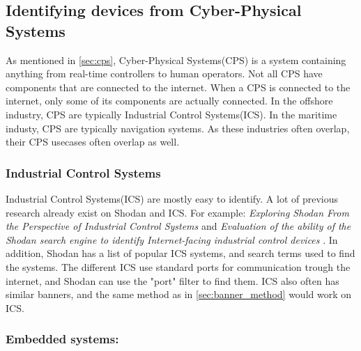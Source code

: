\subsection{Identifying devices from Cyber-Physical Systems} \label{sec:identify_cps}
As mentioned in \cref{sec:cps}, Cyber-Physical Systems(CPS) is a system containing anything from real-time controllers to human operators. Not all CPS have components that are connected to the internet. When a CPS is connected to the internet, only some of its components are actually connected. In the offshore industry, CPS are typically Industrial Control Systems(ICS). In the maritime industy, CPS are typically navigation systems. As these industries often overlap, their CPS usecases often overlap as well.

\subsubsection{Industrial Control Systems}
Industrial Control Systems(ICS) are mostly easy to identify. A lot of previous research already exist on Shodan and ICS. For example: \textit{Exploring Shodan From the Perspective of Industrial Control Systems}\cite{bodenheim_butts_dunlap_mullins_2014} and \textit{Evaluation of the ability of the Shodan search engine to identify Internet-facing industrial control devices} \cite{ICS_shodan_article}.  In addition, Shodan has a list of popular ICS systems, and search terms used to find the systems.\cite{shodan_ics} The different ICS use standard ports for communication trough the internet, and Shodan can use the "port" filter to find them. ICS also often has similar banners, and the same method as in \cref{sec:banner_method} would work on ICS.

\subsubsection{Embedded systems:}

\newpage
